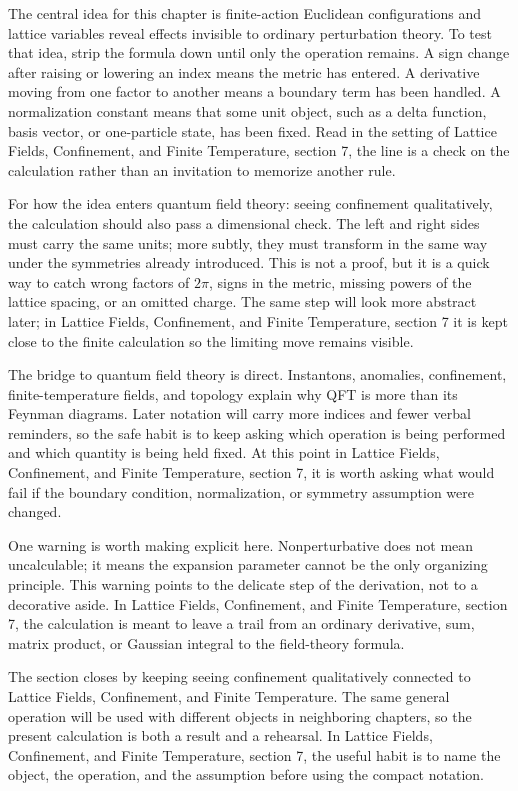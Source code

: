 The central idea for this chapter is finite-action Euclidean configurations and lattice variables reveal effects invisible to ordinary perturbation theory.  To test that idea, strip the formula down until only the operation remains.  A sign change after raising or lowering an index means the metric has entered.  A derivative moving from one factor to another means a boundary term has been handled.  A normalization constant means that some unit object, such as a delta function, basis vector, or one-particle state, has been fixed.  Read in the setting of Lattice Fields, Confinement, and Finite Temperature, section 7, the line is a check on the calculation rather than an invitation to memorize another rule.

For how the idea enters quantum field theory: seeing confinement qualitatively, the calculation should also pass a dimensional check.  The left and right sides must carry the same units; more subtly, they must transform in the same way under the symmetries already introduced.  This is not a proof, but it is a quick way to catch wrong factors of \(2\pi\), signs in the metric, missing powers of the lattice spacing, or an omitted charge.  The same step will look more abstract later; in Lattice Fields, Confinement, and Finite Temperature, section 7 it is kept close to the finite calculation so the limiting move remains visible.

The bridge to quantum field theory is direct.  Instantons, anomalies, confinement, finite-temperature fields, and topology explain why QFT is more than its Feynman diagrams.  Later notation will carry more indices and fewer verbal reminders, so the safe habit is to keep asking which operation is being performed and which quantity is being held fixed.  At this point in Lattice Fields, Confinement, and Finite Temperature, section 7, it is worth asking what would fail if the boundary condition, normalization, or symmetry assumption were changed.

One warning is worth making explicit here.  Nonperturbative does not mean uncalculable; it means the expansion parameter cannot be the only organizing principle.  This warning points to the delicate step of the derivation, not to a decorative aside.  In Lattice Fields, Confinement, and Finite Temperature, section 7, the calculation is meant to leave a trail from an ordinary derivative, sum, matrix product, or Gaussian integral to the field-theory formula.

The section closes by keeping seeing confinement qualitatively connected to Lattice Fields, Confinement, and Finite Temperature.  The same general operation will be used with different objects in neighboring chapters, so the present calculation is both a result and a rehearsal.  In Lattice Fields, Confinement, and Finite Temperature, section 7, the useful habit is to name the object, the operation, and the assumption before using the compact notation.



